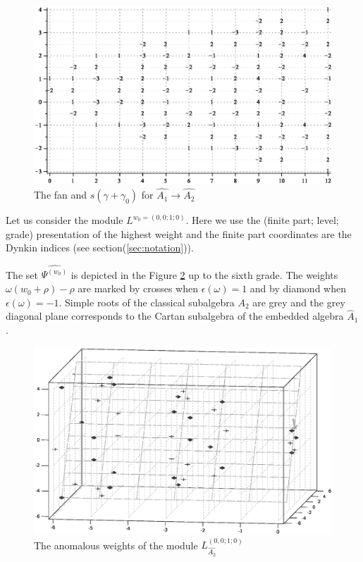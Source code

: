 \documentclass[12pt]{iopart}
\theoremstyle{definition}
\theoremstyle{definition}
\theoremstyle{definition}
\begin{document}
\begin{figure}[h!bt]
  \centering
  \includegraphics[width=135mm]{figure6.eps}
  \caption{The fan and $s(\gamma+\gamma_0)$ for $\hat{A_1}\longrightarrow \hat{A_2}$}
  \label{fig:AffineA2A1Fan}
\end{figure}

Let us consider the module $L^{w_0=(0,0;1;0)}$. Here we use the (finite part; level; grade)
presentation of the highest weight and the finite part
coordinates are the Dynkin indices (see section(\ref{sec:notation})).

The set $\widehat{\Psi^{(w_0)}}$  is depicted in the Figure
\ref{fig:affine_A2_anom_point} up to the sixth grade.
The weights $\omega (w_0+\rho)-\rho$ are marked by crosses when $\epsilon(\omega)=1$ and
by diamond when $\epsilon(\omega)=-1$. Simple roots of the classical subalgebra $A_2$ are
grey and the grey diagonal plane corresponds to the Cartan subalgebra of
the embedded algebra $\hat{A}_1$.

\begin{figure}[h!tb]
  \includegraphics[width=140mm]{figure7.eps}
  \caption{The anomalous weights of the module $L^{(0,0;1;0)}_{\hat{A_2}}$}
  \label{fig:affine_A2_anom_point}
\end{figure}
\end{document}
